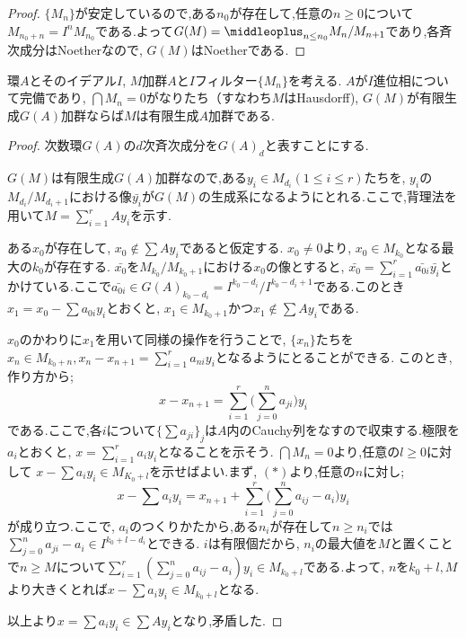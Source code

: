 \begin{proof}
	$\{M_n\}$が安定しているので,ある$n_0$が存在して,任意の$n\geq0$について$M_{n_0+n}=I^nM_{n_0}$である.よって$G(M)=\middleoplus_{n\leq n_0}M_n/M_{n+1}$であり,各斉次成分はNoetherなので, $G(M)$はNoetherである.
\end{proof}

\begin{prop}
	環$A$とそのイデアル$I$, $M$加群$A$と$I$フィルター$\{M_n\}$を考える. $A$が$I$進位相について完備であり, $\bigcap M_n=0$がなりたち（すなわち$M$はHausdorff), $G(M)$が有限生成$G(A)$加群ならば$M$は有限生成$A$加群である.
\end{prop}

\begin{proof}
	次数環$G(A)$の$d$次斉次成分を$G(A)_d$と表すことにする.
	
	$G(M)$は有限生成$G(A)$加群なので,ある$y_i\in M_{d_i} (1\leq i\leq r)$たちを, $y_i$の$M_{d_i}/M_{d_i+1}$における像$\bar{y_i}$が$G(M)$の生成系になるようにとれる.ここで,背理法を用いて$M=\sum_{i=1}^r Ay_i$を示す.
	
	ある$x_0$が存在して, $x_0\not\in\sum Ay_i$であると仮定する. $x_0\neq0$より, $x_0\in M_{k_0}$となる最大の$k_0$が存在する. $\bar{x_0}$を$M_{k_0}/M_{k_0+1}$における$x_0$の像とすると, $\bar{x_0}=\sum_{i=1}^r\bar{a_{0i}}\bar{y_i}$とかけている.ここで$\bar{a_{0i}}\in G(A)_{k_0-d_i}=I^{k_0-d_i}/I^{k_0-d_i+1}$である.このとき$x_1=x_0-\sum a_{0i}y_i$とおくと, $x_1\in M_{k_0+1}$かつ$x_1\not\in\sum Ay_i$である.
	
	$x_0$のかわりに$x_1$を用いて同様の操作を行うことで, $\{x_n\}$たちを$x_n\in M_{k_0+n}, x_n-x_{n+1}=\sum_{i=1}^r a_{ni}y_i$となるようにとることができる. このとき,作り方から;
	\[x-x_{n+1}=\sum_{i=1}^r\biggl(\sum_{j=0}^n a_{ji}\biggr) y_i\tag{$\ast$}\]
	である.ここで,各$i$について$\{\sum a_{ji}\}_j$は$A$内のCauchy列をなすので収束する.極限を$a_i$とおくと, $x=\sum_{i=1}^r a_iy_i$となることを示そう. $\bigcap M_n=0$より,任意の$l\geq0$に対して $x-\sum a_iy_i\in M_{K_0+l}$を示せばよい.まず, $(\ast)$より,任意の$n$に対し;
	\[x-\sum a_iy_i=x_{n+1}+\sum_{i=1}^r\biggl(\sum_{j=0}^{n} a_{ij}-a_i\biggr)y_i\]
	が成り立つ.ここで, $a_i$のつくりかたから,ある$n_i$が存在して$n\geq n_i$では$\sum_{j=0}^n a_{ji}-a_i\in I^{k_0+l-d_i}$とできる. $i$は有限個だから, $n_i$の最大値を$M$と置くことで$n\geq M$について$\sum_{i=1}^r(\sum_{j=0}^n a_{ij}-a_i)y_i\in M_{k_0+l}$である.よって, $n$を$k_0+l,M$より大きくとれば$x-\sum a_iy_i\in M_{k_0+l}$となる.
	
	以上より$x=\sum a_iy_i\in\sum Ay_i$となり,矛盾した.
\end{proof}

